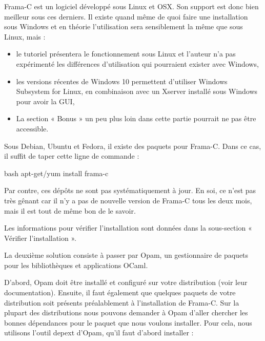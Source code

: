 Frama-C est un logiciel développé sous Linux et OSX. Son support est donc bien
meilleur sous ces derniers. Il existe quand même de quoi faire une installation
sous Windows et en théorie l'utilisation sera sensiblement la même que sous
Linux, mais :



\begin{Warning}
\begin{itemize}
\item le tutoriel présentera le fonctionnement sous Linux et l'auteur n'a pas
expérimenté les différences d'utilisation qui pourraient exister avec
Windows,
\item les versions récentes de Windows 10 permettent d'utiliser Windows Subsystem
  for Linux, en combinaison avec un Xserver installé sous Windows pour avoir la
  GUI,
\item La section « Bonus » un peu plus loin dans cette partie pourrait ne pas être
accessible.
\end{itemize}
\end{Warning}






Sous Debian, Ubuntu et Fedora, il existe des paquets pour Frama-C. Dans ce cas,
il suffit de taper cette ligne de commande :



\begin{CodeBlock}{bash}
apt-get/yum install frama-c
\end{CodeBlock}



Par contre, ces dépôts ne sont pas systématiquement à jour. En soi, ce n'est pas très gênant car il n'y a pas de nouvelle version de Frama-C tous les deux mois, mais il est tout de même bon de le savoir.



Les informations pour vérifier l'installation sont données dans la sous-section « Vérifier l'installation ».




La deuxième solution consiste à passer par Opam, un gestionnaire de paquets
pour les bibliothèques et applications OCaml.


D'abord, Opam doit être installé et configuré sur votre distribution (voir
leur documentation). Ensuite, il faut également que quelques paquets de votre
distribution soit présents préalablement à l'installation de Frama-C. Sur la
plupart des distributions nous pouvons demander à Opam d'aller chercher les
bonnes dépendances pour le paquet que nous voulons installer. Pour cela, nous
utilisons l'outil depext d'Opam, qu'il faut d'abord installer :


